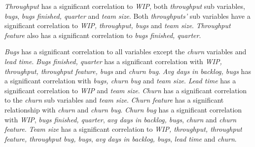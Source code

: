 \documentclass[UKenglish]{ifimaster}  %
\begin{document}
\textit{Throughput} has a significant correlation to \textit{WIP}, both \textit{throughput} sub variables, \textit{bugs}, \textit{bugs finished, quarter} and \textit{team size}. Both \textit{throughputs'} sub variables have a significant correlation to \textit{WIP, throughput, bugs} and \textit{team size}. \textit{Throughput feature} also has a significant correlation to \textit{bugs finished, quarter}.  


\textit{Bugs} has a significant correlation to all variables except the \textit{churn} variables and \textit{lead time}. \textit{Bugs finished, quarter}  has a significant correlation with \textit{WIP, throughput, throughput feature, bugs} and \textit{churn bug}. \textit{Avg days in backlog, bugs} has a significant correlation with \textit{bugs, churn bug} and \textit{team size}. \textit{Lead time} has a significant correlation to \textit{WIP} and \textit{team size}. \textit{Churn} has a significant correlation to the \textit{churn} sub variables and \textit{team size}. \textit{Churn feature} has a significant relationship with \textit{churn} and \textit{churn bug}. \textit{Churn bug} has a significant correlation with \textit{WIP}, \textit{bugs finished, quarter}, \textit{avg days in backlog, bugs}, \textit{churn} and \textit{churn feature}.  \textit{Team size} has a significant correlation to \textit{WIP, throughput, throughput feature, throughput bug, bugs}, \textit{avg days in backlog, bugs}, \textit{lead time} and \textit{churn}.
\end{document}
